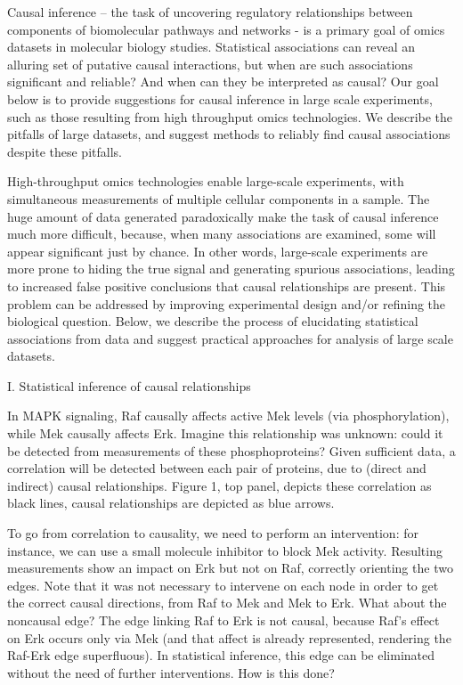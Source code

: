 \documentclass[]{article}
\date{}
\begin{document}
Causal inference -- the task of uncovering regulatory relationships
between components of biomolecular pathways and networks - is a primary
goal of omics datasets in molecular biology studies. Statistical
associations can reveal an alluring set of putative causal interactions,
but when are such associations significant and reliable? And when can
they be interpreted as causal? Our goal below is to provide suggestions
for causal inference in large scale experiments, such as those resulting
from high throughput omics technologies. We describe the pitfalls of
large datasets, and suggest methods to reliably find causal associations
despite these pitfalls.

High-throughput omics technologies enable large-scale experiments, with
simultaneous measurements of multiple cellular components in a sample.
The huge amount of data generated paradoxically make the task of causal
inference much more difficult, because, when many associations are
examined, some will appear significant just by chance. In other words,
large-scale experiments are more prone to hiding the true signal and
generating spurious associations, leading to increased false positive
conclusions that causal relationships are present. This problem can be
addressed by improving experimental design and/or refining the
biological question. Below, we describe the process of elucidating
statistical associations from data and suggest practical approaches for
analysis of large scale datasets.

I. Statistical inference of causal relationships

In MAPK signaling, Raf causally affects active Mek levels (via
phosphorylation), while Mek causally affects Erk. Imagine this
relationship was unknown: could it be detected from measurements of
these phosphoproteins? Given sufficient data, a correlation will be
detected between each pair of proteins, due to (direct and indirect)
causal relationships. Figure 1, top panel, depicts these correlation as
black lines, causal relationships are depicted as blue arrows.

To go from correlation to causality, we need to perform an intervention:
for instance, we can use a small molecule inhibitor to block Mek
activity. Resulting measurements show an impact on Erk but not on Raf,
correctly orienting the two edges. Note that it was not necessary to
intervene on each node in order to get the correct causal directions,
from Raf to Mek and Mek to Erk. What about the noncausal edge? The edge
linking Raf to Erk is not causal, because Raf's effect on Erk occurs
only via Mek (and that affect is already represented, rendering the
Raf-Erk edge superfluous). In statistical inference, this edge can be
eliminated without the need of further interventions. How is this done?
\end{document}
